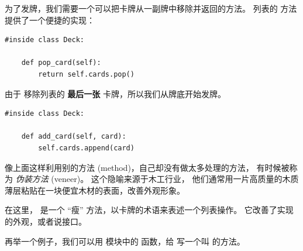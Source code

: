 为了发牌，我们需要一个可以把卡牌从一副牌中移除并返回的方法。
列表的  方法提供了一个便捷的实现：


\begin{lstlisting}
#inside class Deck:

    def pop_card(self):
        return self.cards.pop()
\end{lstlisting}


由于  移除列表的 {\bf 最后一张} 卡牌，所以我们从牌底开始发牌。



\begin{lstlisting}
#inside class Deck:

    def add_card(self, card):
        self.cards.append(card)
\end{lstlisting}


像上面这样利用别的方法 (method)，自己却没有做太多处理的方法，
有时候被称为 {\em 伪装方法} (veneer)。
这个隐喻来源于木工行业， 他们通常用一片高质量的木质薄层粘贴在一块便宜木材的表面，改善外观形象。



在这里， 是一个 ``瘦'' 方法，以卡牌的术语来表述一个列表操作。
它改善了实现的外观，或者说接口。


再举一个例子，我们可以用  模块中的
 函数，给  写一个叫  的方法。


